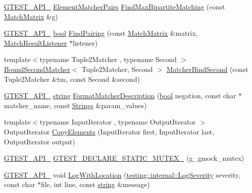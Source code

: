 \begin{DoxyCompactItemize}
\item 
\hyperlink{gtest-port_8h_aa73be6f0ba4a7456180a94904ce17790}{G\+T\+E\+S\+T\+\_\+\+A\+P\+I\+\_\+} \hyperlink{namespacetesting_1_1internal_a0038618710c01a71150887dc7cfb0a29}{Element\+Matcher\+Pairs} \hyperlink{namespacetesting_1_1internal_ae30bd8357c179334b2b09b0d689efccc}{Find\+Max\+Bipartite\+Matching} (const \hyperlink{classtesting_1_1internal_1_1MatchMatrix}{Match\+Matrix} \&g)
\item 
\hyperlink{gtest-port_8h_aa73be6f0ba4a7456180a94904ce17790}{G\+T\+E\+S\+T\+\_\+\+A\+P\+I\+\_\+} \hyperlink{classbool}{bool} \hyperlink{namespacetesting_1_1internal_af2bd2e350b56422a3d9d3b986ac1df0e}{Find\+Pairing} (const \hyperlink{classtesting_1_1internal_1_1MatchMatrix}{Match\+Matrix} \&matrix, \hyperlink{classtesting_1_1MatchResultListener}{Match\+Result\+Listener} $\ast$listener)
\item 
{\footnotesize template$<$typename Tuple2\+Matcher , typename Second $>$ }\\\hyperlink{classtesting_1_1internal_1_1BoundSecondMatcher}{Bound\+Second\+Matcher}$<$ Tuple2\+Matcher, Second $>$ \hyperlink{namespacetesting_1_1internal_a31eb77a2bb0ca713d6ef07d8a3b9af9e}{Matcher\+Bind\+Second} (const Tuple2\+Matcher \&tm, const Second \&second)
\item 
\hyperlink{gtest-port_8h_aa73be6f0ba4a7456180a94904ce17790}{G\+T\+E\+S\+T\+\_\+\+A\+P\+I\+\_\+} \hyperlink{namespacetesting_1_1internal_a8e8ff5b11e64078831112677156cb111}{string} \hyperlink{namespacetesting_1_1internal_a593b52fcbb46a765a31850661b1960f4}{Format\+Matcher\+Description} (\hyperlink{classbool}{bool} negation, const char $\ast$matcher\+\_\+name, const \hyperlink{namespacetesting_1_1internal_a7706b17f05f4b49e351b052ae4e05073}{Strings} \&param\+\_\+values)
\item 
{\footnotesize template$<$typename Input\+Iterator , typename Output\+Iterator $>$ }\\Output\+Iterator \hyperlink{namespacetesting_1_1internal_a9372c12747bcf964aacb1284f8048cae}{Copy\+Elements} (Input\+Iterator first, Input\+Iterator last, Output\+Iterator output)
\item 
\hyperlink{gtest-port_8h_aa73be6f0ba4a7456180a94904ce17790}{G\+T\+E\+S\+T\+\_\+\+A\+P\+I\+\_\+} \hyperlink{namespacetesting_1_1internal_ae4d273e9b76b40a28483826518e68f17}{G\+T\+E\+S\+T\+\_\+\+D\+E\+C\+L\+A\+R\+E\+\_\+\+S\+T\+A\+T\+I\+C\+\_\+\+M\+U\+T\+E\+X\+\_\+} (g\+\_\+gmock\+\_\+mutex)
\item 
\hyperlink{gtest-port_8h_aa73be6f0ba4a7456180a94904ce17790}{G\+T\+E\+S\+T\+\_\+\+A\+P\+I\+\_\+} void \hyperlink{namespacetesting_1_1internal_af271cd1fc0b62a7f4736cb3109e86a37}{Log\+With\+Location} (\hyperlink{namespacetesting_1_1internal_a203d1a8a2147a53d12bbdae40d443914}{testing\+::internal\+::\+Log\+Severity} severity, const char $\ast$file, int line, const \hyperlink{namespacetesting_1_1internal_a8e8ff5b11e64078831112677156cb111}{string} \&message)

\end{DoxyCompactItemize}
